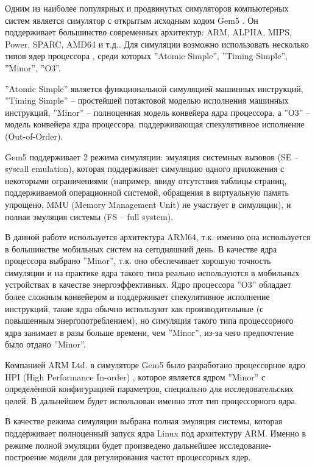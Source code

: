     Одним из наиболее популярных и продвинутых симуляторов компьютерных систем является симулятор
    с открытым исходным кодом Gem5 \cite{binkert2011gem5}. Он поддерживает большинство современных
    архитектур: ARM, ALPHA, MIPS, Power, SPARC, AMD64 и т.д.. Для симуляции возможно использовать
    несколько типов ядер процессора \cite{gem52017ArchExpl}, среди которых ''Atomic Simple'',
    ''Timing Simple'', ''Minor'', ''O3''.

    ''Atomic Simple'' является функциональной симуляцией
    машинных инструкций, ''Timing Simple'' -- простейшей потактовой моделью исполнения машинных
    инструкций, ''Minor'' -- полноценная модель конвейера ядра процессора,
    а ''O3'' -- модель конвейера ядра процессора, поддерживающая спекулятивное исполнение (Out-of-Order).

    Gem5 поддерживает 2 режима симуляции: эмуляция системных вызовов (SE -- syscall emulation), которая
    поддерживает симуляцию одного приложения с некоторыми ограничениями (например, ввиду отсутствия таблицы
    страниц, поддерживаемой операционной системой, обращения в виртуальную память упрощено, MMU (Memory
    Management Unit) не участвует в симуляции), и полная эмуляция системы (FS -- full system).

    В данной работе используется архитектура ARM64, т.к. именно она используется в большинстве мобильных
    систем на сегодняшний день. В качестве ядра процессора выбрано ''Minor'', т.к. оно обеспечивает
    хорошую точность симуляции и на практике ядра такого типа реально используются в мобильных
    устройствах в качестве энергоэффективных. Ядро процессора ''O3'' обладает более сложным конвейером и
    поддерживает спекулятивное исполнение инструкций, такие ядра обычно используют как производительные
    (с повышенным энергопотреблением), но симуляция такого типа процессорного ядра занимает
    в разы больше времени, чем ''Minor'', из-за чего предпочтение было отдано ''Minor''.

    Компанией ARM Ltd. в симуляторе Gem5 было разработано процессорное ядро HPI (High Performance In-order)
    \cite{gem52017HPI}, которое является ядром ''Minor'' с определённой конфигурацией параметров,
    специально для исследовательских целей. В дальнейшем будет использован именно этот тип процессорного ядра.

    В качестве режима симуляции выбрана полная эмуляция системы, которая поддерживает полноценный запуск
    ядра Linux под архитектуру ARM. Именно в режиме полной эмуляции будет произведено дальнейшее
    исследование-построение модели для регулирования частот процессорных ядер.

\newpage
